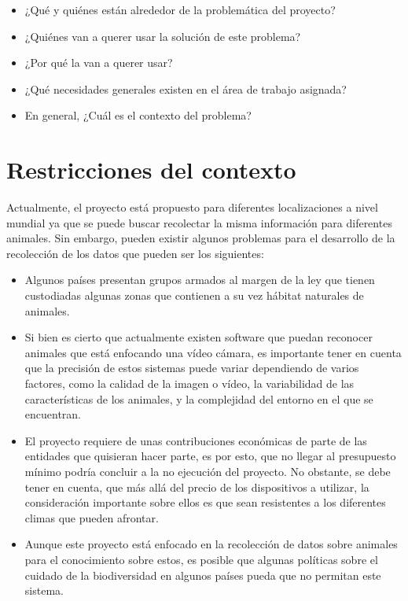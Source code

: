 \begin{itemize}
    \item ¿Qué y quiénes están alrededor de la problemática del proyecto?
    \item ¿Quiénes van a querer usar la solución de este problema?
    \item ¿Por qué la van a querer usar?
    \item ¿Qué necesidades generales existen en el área de trabajo asignada?
    \item En general, ¿Cuál es el contexto del problema?
\end{itemize}

\section{Restricciones del contexto}

Actualmente, el proyecto está propuesto para diferentes localizaciones a nivel mundial ya que se puede buscar recolectar la misma información para diferentes animales. Sin embargo, pueden existir algunos problemas para el desarrollo de la recolección de los datos que pueden ser los siguientes:

\begin{itemize}
    \item Algunos países presentan grupos armados al margen de la ley que tienen custodiadas algunas zonas que contienen a su vez hábitat naturales de animales.
    \item Si bien es cierto que actualmente existen software que puedan reconocer animales que está enfocando una vídeo cámara, es importante tener en cuenta que la precisión de estos sistemas puede variar dependiendo de varios factores, como la calidad de la imagen o vídeo, la variabilidad de las características de los animales, y la complejidad del entorno en el que se encuentran.
    \item El proyecto requiere de unas contribuciones económicas de parte de las entidades que quisieran hacer parte, es por esto, que no llegar al presupuesto mínimo podría concluir a la no ejecución del proyecto. No obstante, se debe tener en cuenta, que más allá del precio de los dispositivos a utilizar, la consideración importante sobre ellos es que sean resistentes a los diferentes climas que pueden afrontar.
    \item Aunque este proyecto está enfocado en la recolección de datos sobre animales para el conocimiento sobre estos, es posible que algunas políticas sobre el cuidado de la biodiversidad en algunos países pueda que no permitan este sistema.
\end{itemize}

